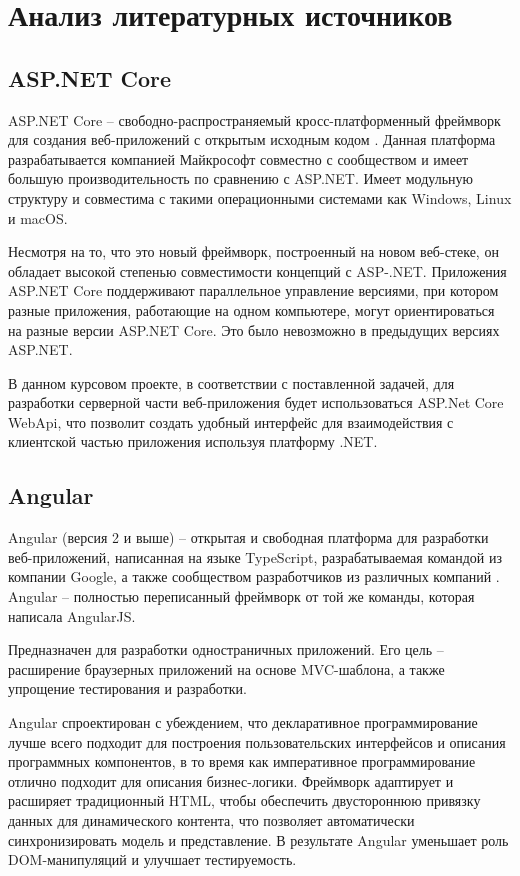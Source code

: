 \section{Анализ литературных источников}
\label{sec:literature_analysis}

\subsection{ASP.NET Core}

ASP.NET Core -- свободно-распространяемый кросс-платформенный фреймворк для создания веб-приложений с открытым исходным кодом \cite{wiki_AspNetCore}. Данная платформа разрабатывается компанией Майкрософт совместно с сообществом и имеет большую производительность по сравнению с ASP.NET. Имеет модульную структуру и совместима с такими операционными системами как Windows, Linux и macOS.

Несмотря на то, что это новый фреймворк, построенный на новом веб-стеке, он обладает высокой степенью совместимости концепций с ASP-.NET. Приложения ASP.NET Core поддерживают параллельное управление версиями, при котором разные приложения, работающие на одном компьютере, могут ориентироваться на разные версии ASP.NET Core. Это было невозможно в предыдущих версиях ASP.NET.

В данном курсовом проекте, в соответствии с поставленной задачей, для разработки серверной части веб-приложения будет использоваться ASP.Net Core WebApi, что позволит создать удобный интерфейс для взаимодействия с клиентской частью приложения используя платформу .NET.

\subsection{Angular}
Angular (версия 2 и выше) -- открытая и свободная платформа для разработки веб-приложений, написанная на языке TypeScript, разрабатываемая командой из компании Google, а также сообществом разработчиков из различных компаний \cite{wiki_Angular}. Angular -- полностью переписанный фреймворк от той же команды, которая написала AngularJS.

Предназначен для разработки одностраничных приложений. Его цель -- расширение браузерных приложений на основе MVC-шаблона, а также упрощение тестирования и разработки.

Angular спроектирован с убеждением, что декларативное программирование лучше всего подходит для построения пользовательских интерфейсов и описания программных компонентов, в то время как императивное программирование отлично подходит для описания бизнес-логики. Фреймворк адаптирует и расширяет традиционный HTML, чтобы обеспечить двустороннюю привязку данных для динамического контента, что позволяет автоматически синхронизировать модель и представление. В результате Angular уменьшает роль DOM-манипуляций и улучшает тестируемость.

